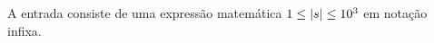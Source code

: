 A entrada consiste de uma expressão matemática $1 \leq \arrowvert s \arrowvert \leq 10^3$ em notação infixa.
